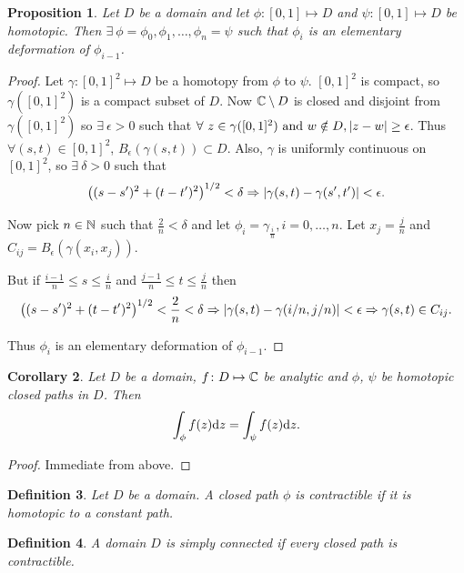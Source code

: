 \documentclass{notes}
\theoremstyle{plain}
\newtheorem{proposition}{Proposition}[chapter]
\newtheorem{corollary}[proposition]{Corollary}
\newtheorem{definition}[proposition]{Definition}
\begin{document}
\begin{proposition}
Let $D$ be a domain and let $\phi \colon [0,1] \mapsto D$ and
$\psi \colon [0,1] \mapsto D$ be homotopic.  Then
$\exists\ \phi = \phi_0, \phi_1, \dots, \phi_n = \psi$ such that
$\phi_i$ is an elementary deformation of $\phi_{i-1}$.
\end{proposition}

\begin{proof}
Let $\gamma \colon [0,1]^2 \mapsto D$ be a homotopy from $\phi$ to $\psi$.
$[0,1]^2$ is compact, so $\gamma([0,1]^2)$ is a compact subset of $D$.
Now $\mathbb{C} \setminus D$ is closed and disjoint from $\gamma([0,1]^2)$ so
$\exists\ \epsilon > 0$ such that $\forall\ z \in \gamma([0,1]^2)
\text{ and } w \notin D, \left|z-w\right| \ge \epsilon$.  Thus $\forall
(s,t) \in [0,1]^2$, $B_\epsilon(\gamma(s,t)) \subset D$.
Also, $\gamma$ is uniformly continuous on $[0,1]^2$, so $\exists\ \delta
> 0$ such that
\[
\left(
(s-s')^2 + (t-t')^2
\right)^{1/2} < \delta
\Rightarrow
\left|\gamma(s,t) - \gamma(s',t')\right| < \epsilon.
\]

Now pick $n \in \mathbb{N}$ such that $\frac{2}{n} < \delta$ and let $\phi_i =
\gamma_{\frac{i}{n}}, i = 0, \dots, n$.  Let $x_j = \frac{j}{n}$ and
$C_{ij} = B_\epsilon (\gamma(x_i,x_j))$.

But if $\frac{i-1}{n} \le s \le \frac{i}{n}$ and $\frac{j-1}{n} \le t \le
\frac{j}{n}$ then 
\[
\left(
(s-s')^2 + (t-t')^2
\right)^{1/2} < \frac{2}{n} < \delta
\Rightarrow
\left|\gamma(s,t) - \gamma(i/n,j/n)\right| < \epsilon
\Rightarrow \gamma(s,t) \in C_{ij}.
\]

Thus $\phi_i$ is an elementary deformation of $\phi_{i-1}$.
\end{proof}

\begin{corollary}
Let $D$ be a domain, $f \colon D \mapsto \mathbb{C}$ be analytic and $\phi$, $\psi$ be
homotopic closed paths in $D$.  Then
\[
\int_\phi f(z) \mathrm{d} z = \int_\psi f(z) \mathrm{d} z.
\]
\end{corollary}

\begin{proof}
Immediate from above.
\end{proof}

\begin{definition}
Let $D$ be a domain.  A closed path $\phi$ is contractible%
 if it is homotopic to a constant path.
\end{definition}

\begin{definition}
A domain $D$ is simply connected if every
closed path is contractible. 
\end{definition}
\end{document}
